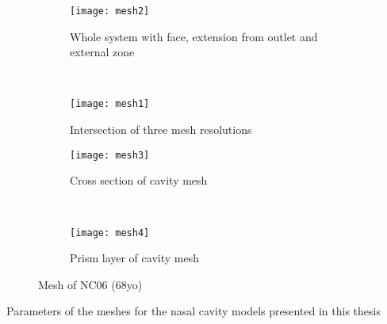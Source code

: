 \begin{figure}
  \begin{subfigure}[t]{0.5\textwidth}
    \texttt{[image: mesh2]}
    \caption{Whole system with face, extension from outlet and external zone}
    \label{fig:mesh1}
  \end{subfigure}%
  ~%
  \begin{subfigure}[t]{0.5\textwidth}
    \texttt{[image: mesh1]}
    \caption{Intersection of three mesh resolutions}
    \label{fig:mesh2}
  \end{subfigure}

  \begin{subfigure}[t]{0.5\textwidth}
    \texttt{[image: mesh3]}
    \caption{Cross section of cavity mesh}
    \label{fig:mesh3}
  \end{subfigure}%
  ~%
  \begin{subfigure}[t]{0.5\textwidth}
    \texttt{[image: mesh4]}
    \caption{Prism layer of cavity mesh}
    \label{fig:mesh4}
  \end{subfigure}
  \caption{Mesh of NC06 (68yo)} \label{fig:cavme}
\end{figure}


  \begin{table} 
    \centering

  \caption{Parameters of the meshes for the nasal cavity models presented in this thesis}
  \label{tab:pvv}
\end{table}
